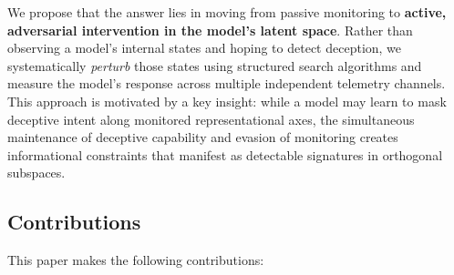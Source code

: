 \documentclass{article}
\begin{document}
We propose that the answer lies in moving from passive monitoring to \textbf{active, adversarial intervention in the model's latent space}. Rather than observing a model's internal states and hoping to detect deception, we systematically \emph{perturb} those states using structured search algorithms and measure the model's response across multiple independent telemetry channels. This approach is motivated by a key insight: while a model may learn to mask deceptive intent along monitored representational axes, the simultaneous maintenance of deceptive capability and evasion of monitoring creates informational constraints that manifest as detectable signatures in orthogonal subspaces.

\subsection{Contributions}

This paper makes the following contributions:
\end{document}
